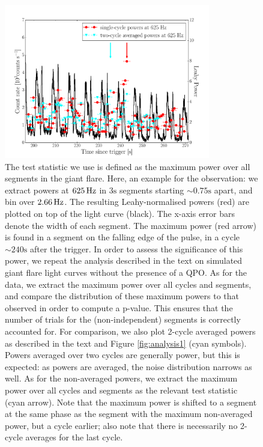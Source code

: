 \documentclass{emulateapj}
\begin{document}
\begin{figure}[htbp]
\begin{center}
\includegraphics[width=9cm]{f2.pdf}
\caption{The test statistic we use is defined as the maximum power over all segments in the giant flare. Here, an example for the \rxte observation: we extract powers at $625 \,\mathrm{Hz}$ in $3\mathrm{s}$ segments starting $\sim 0.75 \mathrm{s}$ apart, and bin over $2.66 \,\mathrm{Hz}$. The resulting Leahy-normalised powers (red) are plotted on top of the \rxte light curve (black). The x-axis error bars denote the width of each segment. The maximum power (red arrow) is found in a segment on the falling edge of the pulse, in a cycle $\sim 240 \mathrm{s}$ after the trigger. In order to assess the significance of this power, we repeat the analysis described in the text on simulated giant flare light curves without the presence of a QPO. As for the data, we extract the maximum power over all cycles and segments, and compare the distribution of these maximum powers to that observed in order to compute a p-value. This ensures that the number of trials for the (non-independent) segments is correctly accounted for. For comparison, we also plot 2-cycle averaged powers as described in the text and Figure \ref{fig:analysis1} (cyan symbols). Powers averaged over two cycles are generally power, but this is expected: as powers are averaged, the noise distribution narrows as well. As for the non-averaged powers, we extract the maximum power over all cycles and segments as the relevant test statistic (cyan arrow). Note that the maximum power is shifted to a segment at the same phase as the segment with the maximum non-averaged power, but a cycle earlier; also note that there is necessarily no 2-cycle averages for the last cycle. }
\label{fig:teststatistic}
\end{center}
\end{figure}
\end{document}
